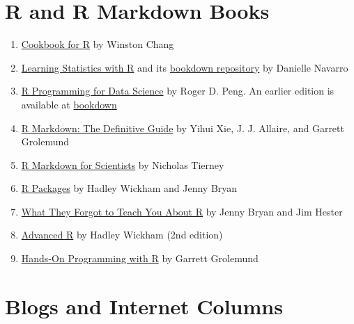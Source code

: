 \documentclass[
]{book}
\providecommand{\tightlist}{%
  \setlength{\itemsep}{0pt}\setlength{\parskip}{0pt}}
\begin{document}
\hypertarget{r-and-r-markdown-books}{%
\section{R and R Markdown Books}\label{r-and-r-markdown-books}}

\begin{enumerate}
\def\labelenumi{\arabic{enumi}.}
\tightlist
\item
  \href{http://www.cookbook-r.com/}{Cookbook for R} by Winston Chang
\item
  \href{https://learningstatisticswithr.com/}{Learning Statistics with R} and its \href{https://learningstatisticswithr.com/book/index.html}{bookdown repository} by Danielle Navarro
\item
  \href{https://leanpub.com/rprogramming}{R Programming for Data Science} by Roger D. Peng. An earlier edition is available at \href{https://bookdown.org/rdpeng/rprogdatascience/}{bookdown}
\item
  \href{https://bookdown.org/yihui/rmarkdown/}{R Markdown: The Definitive Guide} by Yihui Xie, J. J. Allaire, and Garrett Grolemund
\item
  \href{https://rmd4sci.njtierney.com/}{R Markdown for Scientists} by Nicholas Tierney
\item
  \href{https://r-pkgs.org/}{R Packages} by Hadley Wickham and Jenny Bryan
\item
  \href{https://whattheyforgot.org/}{What They Forgot to Teach You About R} by Jenny Bryan and Jim Hester
\item
  \href{https://adv-r.hadley.nz/}{Advanced R} by Hadley Wickham (2nd edition)
\item
  \href{https://rstudio-education.github.io/hopr/}{Hands-On Programming with R} by Garrett Grolemund
\end{enumerate}

\hypertarget{blogs-and-internet-columns}{%
\section{Blogs and Internet Columns}\label{blogs-and-internet-columns}}
\end{document}
